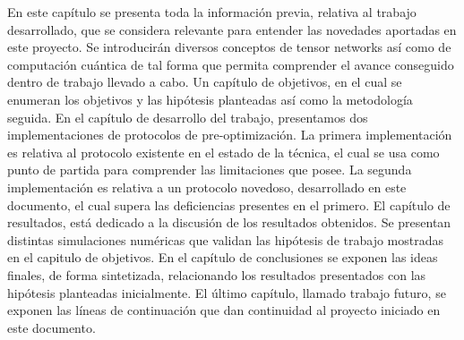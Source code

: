 En este capítulo se presenta toda la información previa, relativa al trabajo desarrollado, que se considera relevante para entender las novedades aportadas en este proyecto. Se introducirán diversos conceptos de tensor networks así como de computación cuántica de tal forma que permita comprender el avance conseguido dentro de trabajo llevado a cabo. Un capítulo de objetivos, en el cual se enumeran los objetivos y las hipótesis planteadas así como la metodología seguida. En el capítulo de desarrollo del trabajo, presentamos dos implementaciones de protocolos de pre-optimización. La primera implementación es relativa al protocolo existente en el estado de la técnica, el cual se usa como punto de partida para comprender las limitaciones que posee. La segunda implementación es relativa a un protocolo novedoso, desarrollado en este documento, el cual supera las deficiencias presentes en el primero. El capítulo de resultados, está dedicado a la discusión de los resultados obtenidos. Se presentan distintas simulaciones numéricas que validan las hipótesis de trabajo mostradas en el capitulo de objetivos. En el capítulo de conclusiones se exponen las ideas finales, de forma sintetizada, relacionando los resultados presentados con las hipótesis planteadas inicialmente. El último capítulo, llamado trabajo futuro, se exponen las líneas de continuación que dan continuidad al proyecto iniciado en este documento.

